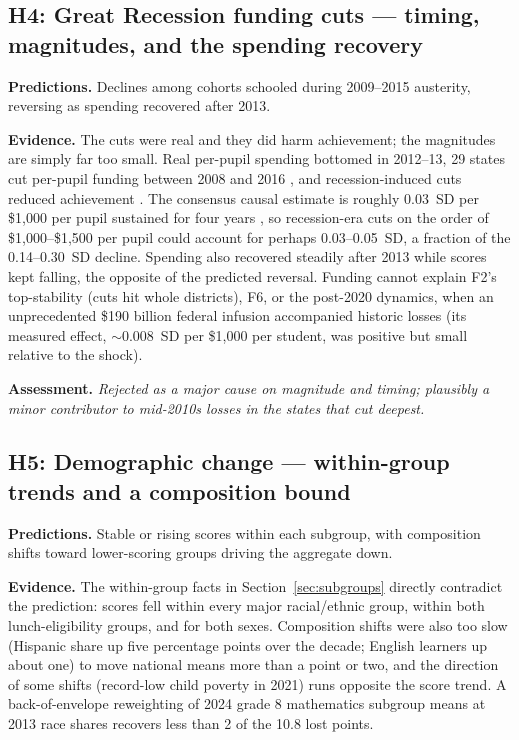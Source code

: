 \documentclass[11pt]{article}
\begin{document}
\subsection{H4: Great Recession funding cuts --- timing, magnitudes, and the spending recovery}

\textbf{Predictions.} Declines among cohorts schooled during 2009--2015 austerity, reversing as spending recovered after 2013.

\textbf{Evidence.} The cuts were real and they did harm achievement; the magnitudes are simply far too small. Real per-pupil spending bottomed in 2012--13, 29 states cut per-pupil funding between 2008 and 2016 \citep{leachman2017}, and recession-induced cuts reduced achievement \citep{jacksonwigger2021}. The consensus causal estimate is roughly 0.03~SD per \$1,000 per pupil sustained for four years \citep{jacksonmackevicius2024}, so recession-era cuts on the order of \$1,000--\$1,500 per pupil could account for perhaps 0.03--0.05~SD, a fraction of the 0.14--0.30~SD decline. Spending also recovered steadily after 2013 while scores kept falling, the opposite of the predicted reversal. Funding cannot explain F2's top-stability (cuts hit whole districts), F6, or the post-2020 dynamics, when an unprecedented \$190 billion federal infusion accompanied historic losses (its measured effect, $\sim$0.008~SD per \$1,000 per student, was positive but small relative to the shock).

\textbf{Assessment.} \emph{Rejected as a major cause on magnitude and timing; plausibly a minor contributor to mid-2010s losses in the states that cut deepest.}

\subsection{H5: Demographic change --- within-group trends and a composition bound}
\label{sec:h5}

\textbf{Predictions.} Stable or rising scores within each subgroup, with composition shifts toward lower-scoring groups driving the aggregate down.

\textbf{Evidence.} The within-group facts in Section~\ref{sec:subgroups} directly contradict the prediction: scores fell within every major racial/ethnic group, within both lunch-eligibility groups, and for both sexes. Composition shifts were also too slow (Hispanic share up five percentage points over the decade; English learners up about one) to move national means more than a point or two, and the direction of some shifts (record-low child poverty in 2021) runs opposite the score trend. A back-of-envelope reweighting of 2024 grade 8 mathematics subgroup means at 2013 race shares recovers less than 2 of the 10.8 lost points.
\end{document}
